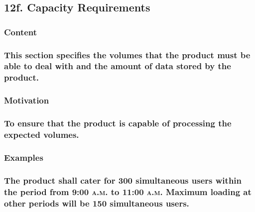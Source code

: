 \documentclass[
]{article}
\begin{document}
\hypertarget{f.-capacity-requirements}{%
\subsection{12f. Capacity Requirements}\label{f.-capacity-requirements}}

\hypertarget{content-42}{%
\subsubsection{Content}\label{content-42}}

\hypertarget{this-section-specifies-the-volumes-that-the-product-must-be-able-to-deal-with-and-the-amount-of-data-stored-by-the-product.}{%
\subsubsection{This section specifies the volumes that the product must
be able to deal with and the amount of data stored by the
product.}\label{this-section-specifies-the-volumes-that-the-product-must-be-able-to-deal-with-and-the-amount-of-data-stored-by-the-product.}}

\hypertarget{motivation-41}{%
\subsubsection{Motivation}\label{motivation-41}}

\hypertarget{to-ensure-that-the-product-is-capable-of-processing-the-expected-volumes.}{%
\subsubsection{To ensure that the product is capable of processing the
expected
volumes.}\label{to-ensure-that-the-product-is-capable-of-processing-the-expected-volumes.}}

\hypertarget{examples-26}{%
\subsubsection{Examples}\label{examples-26}}

\hypertarget{the-product-shall-cater-for-300-simultaneous-users-within-the-period-from-900-a.m.-to-1100-a.m.-maximum-loading-at-other-periods-will-be-150-simultaneous-users.}{%
\subsubsection{\texorpdfstring{The product shall cater for 300
simultaneous users within the period from 9:00 \textsc{a.m.} to 11:00
\textsc{a.m}. Maximum loading at other periods will be 150 simultaneous
users.}{The product shall cater for 300 simultaneous users within the period from 9:00 a.m. to 11:00 a.m. Maximum loading at other periods will be 150 simultaneous users.}}\label{the-product-shall-cater-for-300-simultaneous-users-within-the-period-from-900-a.m.-to-1100-a.m.-maximum-loading-at-other-periods-will-be-150-simultaneous-users.}}
\end{document}
